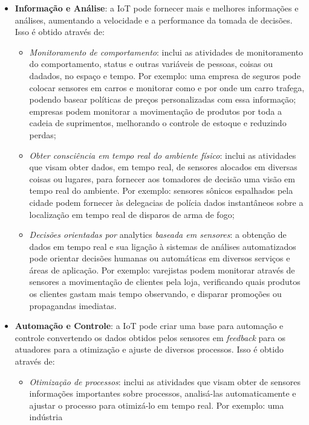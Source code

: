 \documentclass[pdftex, brazil, 12pt, twoside]{article}
\begin{document}
\begin{itemize}
\item \textbf{Informação e Análise}: a IoT pode fornecer mais e melhores
  informações e análises, aumentando a velocidade e a performance da tomada de
  decisões. Isso é obtido através de:
  \begin{itemize}
  \item \emph{Monitoramento de comportamento}: inclui as atividades
    de monitoramento do comportamento, status e outras variáveis de pessoas,
    coisas ou dadados, no espaço e tempo. Por exemplo: uma empresa de seguros
    pode colocar sensores em carros e monitorar como e por onde um carro trafega,
    podendo basear políticas de preços personalizadas com essa informação; empresas
    podem monitorar a movimentação de produtos por toda a cadeia de suprimentos,
    melhorando o controle de estoque e reduzindo perdas;
  \item \emph{Obter consciência em tempo real do ambiente físico}: inclui as
    atividades que visam obter dados, em tempo real, de sensores alocados em
    diversas coisas ou lugares, para fornecer aos tomadores de decisão uma visão
    em tempo real do ambiente. Por exemplo: sensores sônicos espalhados pela cidade
    podem fornecer às delegacias de polícia dados instantâneos sobre a localização
    em tempo real de disparos de arma de fogo;
  \item \emph{Decisões orientadas por} analytics \emph{baseada em sensores}: a
    obtenção de dados em tempo real e sua ligação à sistemas de análises automatizados
    pode orientar decisões humanas ou automáticas em diversos serviços e áreas de
    aplicação. Por exemplo: varejistas podem monitorar através de sensores a
    movimentação de clientes pela loja, verificando quais produtos os clientes
    gastam mais tempo observando, e disparar promoções ou propagandas imediatas.
  \end{itemize}
\item \textbf{Automação e Controle}: a IoT pode criar uma base para
  automação e controle convertendo os dados obtidos pelos sensores em \emph{feedback}
  para os atuadores para a otimização e ajuste de diversos processos. Isso é obtido
  através de:
  \begin{itemize}
  \item \emph{Otimização de processos}: inclui as atividades que visam obter
    de sensores informações importantes sobre processos, analisá-las automaticamente
    e ajustar o processo para otimizá-lo em tempo real. Por exemplo: uma indústria

\end{itemize}
\end{itemize}
\end{document}
